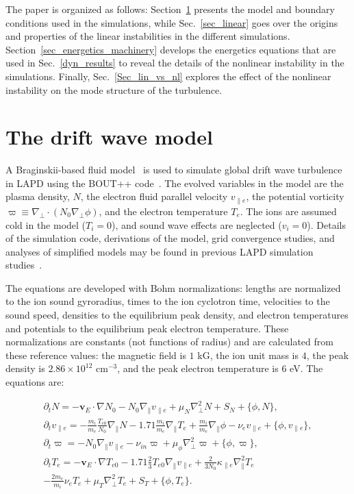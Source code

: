 \documentclass[showpacs,preprintnumbers,amsmath,amssymb,superscriptaddress,aip]{revtex4-1}
\def\beqar{\begin{eqnarray}}
\def\eeqar{\end{eqnarray}}
\newcommand{\pdt}{\partial_t}
\def\grad{\nabla}
\newcommand{\gradpar}{\grad_\parallel}
\newcommand{\gradperp}{\grad_\perp}
\newcommand{\vpe}{v_{\parallel e}}
\newcommand{\nue}{\nu_{e}}
\newcommand{\nuin}{\nu_{in}}
\newcommand{\kpe}{\kappa_{\parallel e}}
\newcommand{\fmie}{\frac{m_i}{m_e}}
\begin{document}
The paper is organized as follows: Section~\ref{dw_model} presents the model and boundary conditions used in the simulations, while 
Sec.~\ref{sec_linear} goes over the origins and properties of the linear instabilities in the different simulations.
Section~\ref{sec_energetics_machinery} develops the energetics equations that are used in Sec.~\ref{dyn_results} to reveal the details of the nonlinear instability in the simulations.
Finally, Sec.~\ref{Sec_lin_vs_nl} explores the effect of the nonlinear instability on the mode structure of the turbulence.



\section{The drift wave model}
\label{dw_model}

A Braginskii-based fluid model~\cite{Braginskii1965} is used to simulate global drift wave turbulence in LAPD using the BOUT++ code~\cite{dudson2009}. 
The evolved variables in the model are the plasma density, $N$, the electron fluid parallel velocity $\vpe$, the potential vorticity $\varpi \equiv \gradperp \cdot (N_0 \gradperp \phi)$,
and the electron temperature $T_e$. The ions are assumed cold in the
model ($T_i = 0$), and sound wave effects are neglected ($v_i = 0$). Details of the simulation code, derivations of the model, grid convergence studies, and analyses of simplified models
may be found in previous LAPD simulation studies~\cite{Popovich2010a,Popovich2010b,Umansky2011,friedman2012,friedman2012b}.

The equations are developed with Bohm normalizations: lengths are
normalized to the ion sound gyroradius, times to the ion
cyclotron time, velocities to the sound speed, densities to the equilibrium peak density, and electron
temperatures and potentials to the equilibrium peak electron temperature. These normalizations are constants (not functions of radius) and are calculated from these reference values:
the magnetic field is $1$ kG, the ion unit mass is $4$, the peak density is $2.86 \times 10^{12}$ cm$^{-3}$, and the peak electron temperature
is $6$ eV. The equations are:

\beqar
\label{ni_eq}
\pdt N = - {\mathbf v_E} \cdot \grad N_0 - N_0 \gradpar \vpe + \mu_N \gradperp^2 N + S_N + \{\phi,N\}, \\
\label{ve_eq}
\pdt \vpe = - \fmie \frac{T_{e0}}{N_0} \gradpar N - 1.71 \fmie \gradpar T_e  + \fmie \gradpar \phi - \nue \vpe + \{\phi,\vpe \}, \\
\label{rho_eq}
\pdt \varpi = - N_0 \gradpar \vpe  - \nuin \varpi + \mu_\phi \gradperp^2 \varpi + \{\phi,\varpi \}, \\
\label{te_eq}
\pdt T_e = - {\mathbf v_E} \cdot \grad T_{e0} - 1.71 \frac{2}{3} T_{e0} \gradpar \vpe + \frac{2}{3 N_0} \kpe \gradpar^2 T_e  \nonumber \\
- \frac{2 m_e}{m_i} \nue T_e  + \mu_T \gradperp^2 T_e +  S_T + \{\phi,T_e\}.
\eeqar
\end{document}
